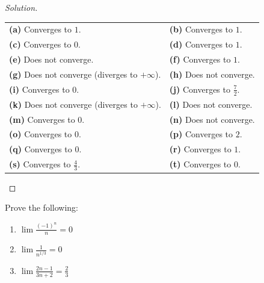\documentclass[11pt]{scrartcl}
\providecommand{\ii}{\item}
\theoremstyle{remark}
\newenvironment{problem}[1]
{\renewcommand\theinnercustomthm{\textit{#1}}\innercustomthm}
{\endinnercustomthm}
\newenvironment{soln}{\begin{proof}[Solution]}{\end{proof}}
\begin{document}
	\begin{soln}\phantom{buh}
		
		\begin{tabularx}{\linewidth}{XX}
			\textbf{(a)} Converges to $1$. & \textbf{(b)} Converges to $1$.\\
			\textbf{(c)} Converges to $0$. & \textbf{(d)} Converges to $1$.\\
			\textbf{(e)} Does not converge.& \textbf{(f)} Converges to $1$.\\
			\textbf{(g)} Does not converge (diverges to $+\infty$).& \textbf{(h)} Does not converge.\\
			\textbf{(i)} Converges to $0$.& \textbf{(j)} Converges to $\frac 72$.\\
			\textbf{(k)} Does not converge (diverges to $+\infty$).& \textbf{(l)} Does not converge.\\
			\textbf{(m)} Converges to $0$.& \textbf{(n)} Does not converge.\\
			\textbf{(o)} Converges to $0$.& \textbf{(p)} Converges to $2$.\\
			\textbf{(q)} Converges to $0$.& \textbf{(r)} Converges to $1$.\\
			\textbf{(s)} Converges to $\frac43$.& \textbf{(t)} Converges to $0$.
		\end{tabularx}
	\end{soln}
	
	\begin{problem}{8.1}
		Prove the following:
		\begin{enumerate}[\textbf{(\alph*)}]
			\ii $\lim \frac{(-1)^n}{n} = 0$
			\ii $\lim \frac{1}{n^{1/3}} = 0$
			\ii $\lim \frac{2n - 1}{3n + 2} = \frac23$
		\end{enumerate}
	\end{problem}
	
\end{document}
